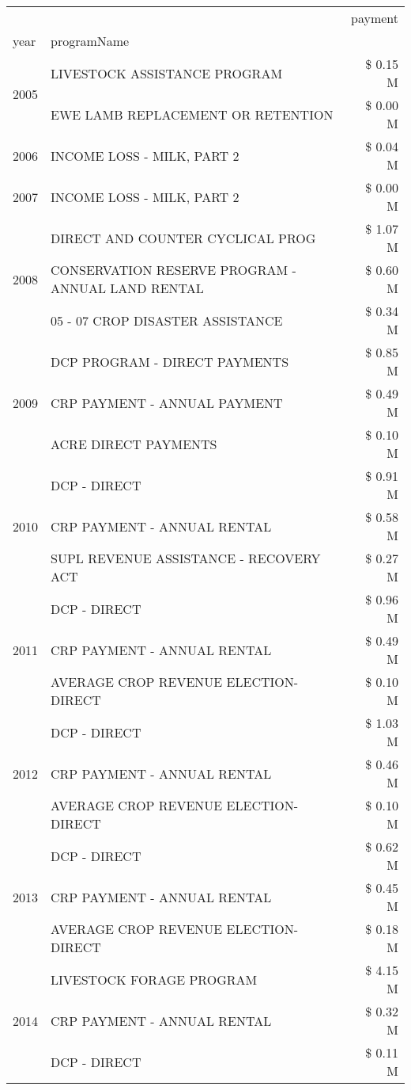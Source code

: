 \begin{tabular}{llr}
\toprule
 &  & payment \\
year & programName &  \\
\midrule
\multirow[t]{2}{*}{2005} & LIVESTOCK ASSISTANCE PROGRAM & \$ 0.15 M \\
 & EWE LAMB REPLACEMENT OR RETENTION & \$ 0.00 M \\
\cline{1-3}
2006 & INCOME LOSS - MILK, PART 2 & \$ 0.04 M \\
\cline{1-3}
2007 & INCOME LOSS - MILK, PART 2 & \$ 0.00 M \\
\cline{1-3}
\multirow[t]{3}{*}{2008} & DIRECT AND COUNTER CYCLICAL PROG & \$ 1.07 M \\
 & CONSERVATION RESERVE PROGRAM - ANNUAL LAND RENTAL & \$ 0.60 M \\
 & 05 - 07 CROP DISASTER ASSISTANCE & \$ 0.34 M \\
\cline{1-3}
\multirow[t]{3}{*}{2009} & DCP PROGRAM - DIRECT PAYMENTS & \$ 0.85 M \\
 & CRP PAYMENT - ANNUAL PAYMENT & \$ 0.49 M \\
 & ACRE DIRECT PAYMENTS & \$ 0.10 M \\
\cline{1-3}
\multirow[t]{3}{*}{2010} & DCP - DIRECT & \$ 0.91 M \\
 & CRP PAYMENT - ANNUAL RENTAL & \$ 0.58 M \\
 & SUPL REVENUE ASSISTANCE - RECOVERY ACT & \$ 0.27 M \\
\cline{1-3}
\multirow[t]{3}{*}{2011} & DCP - DIRECT & \$ 0.96 M \\
 & CRP PAYMENT - ANNUAL RENTAL & \$ 0.49 M \\
 & AVERAGE CROP REVENUE ELECTION-DIRECT & \$ 0.10 M \\
\cline{1-3}
\multirow[t]{3}{*}{2012} & DCP - DIRECT & \$ 1.03 M \\
 & CRP PAYMENT - ANNUAL RENTAL & \$ 0.46 M \\
 & AVERAGE CROP REVENUE ELECTION-DIRECT & \$ 0.10 M \\
\cline{1-3}
\multirow[t]{3}{*}{2013} & DCP - DIRECT & \$ 0.62 M \\
 & CRP PAYMENT - ANNUAL RENTAL & \$ 0.45 M \\
 & AVERAGE CROP REVENUE ELECTION-DIRECT & \$ 0.18 M \\
\cline{1-3}
\multirow[t]{3}{*}{2014} & LIVESTOCK FORAGE PROGRAM & \$ 4.15 M \\
 & CRP PAYMENT - ANNUAL RENTAL & \$ 0.32 M \\
 & DCP - DIRECT & \$ 0.11 M \\

\end{tabular}
